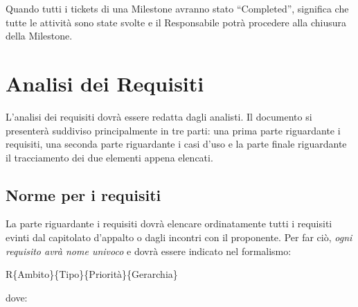 Quando tutti i tickets di una Milestone avranno stato ``Completed'', significa che tutte le attività sono state svolte e il Responsabile potrà procedere alla chiusura della Milestone.

\newpage
\section{Analisi dei Requisiti}
L'analisi dei requisiti dovrà essere redatta dagli analisti. Il documento si presenterà suddiviso principalmente in tre parti: una prima parte riguardante i requisiti, una seconda parte riguardante i casi d'uso e la parte finale riguardante il tracciamento dei due elementi appena elencati.

\subsection{Norme per i requisiti}
La parte riguardante i requisiti dovrà elencare ordinatamente tutti i requisiti evinti dal capitolato d'appalto o dagli incontri con il proponente. Per far ciò, \textit{ogni requisito avrà nome univoco} e dovrà essere indicato nel formalismo:
\begin{center}
R\{Ambito\}\{Tipo\}\{Priorità\}\{Gerarchia\}
\end{center}
dove:
